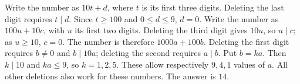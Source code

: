 Write the number as $10t+d$, where $t$ is its first three digits. Deleting the last digit requires $t\mid d$. Since $t\ge100$ and $0\le d\le9$, $d=0$. Write the number as $100u+10c$, with $u$ its first two digits. Deleting the third digit gives $10u$, so $u\mid c$; as $u\ge10$, $c=0$. The number is therefore $1000a+100b$. Deleting the first digit requires $b\ne0$ and $b\mid10a$; deleting the second requires $a\mid b$. Put $b=ka$. Then $k\mid10$ and $ka\le9$, so $k=1,2,5$. These allow respectively $9,4,1$ values of $a$. All other deletions also work for these numbers. The answer is $\boxed{14}$.
